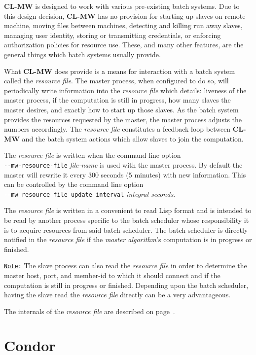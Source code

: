 \documentclass[titlepage,12pt]{book}
\newcommand{\xsmall}{\latexhtml{\small}{}}
\newcommand{\xnormalsize}{\latexhtml{\normalsize}{}}
\newcommand{\clmw}{\xsmall\textbf{CL-MW}\xnormalsize\xspace}
\newcommand{\ma}{\textit{master algorithm}\xspace}
\newcommand{\rfile}{\textit{resource file}\xspace}
\newcommand{\dash}{\texttt{-}}
\newcommand{\OptionV}[2]{\dash\dash\texttt{#1} \textit{#2}}
\newcommand{\Note}{\texttt{\underline{Note}:}\xspace}
\begin{document}
\clmw is designed to work with various pre-existing batch systems. Due
to this design decision, \clmw has no provision for starting up slaves
on remote machine, moving files between machines, detecting and killing
run away slaves, managing user identity, storing or transmitting
credentials, or enforcing authorization policies for resource use.
These, and many other features, are the general things which batch
systems usually provide.

What \clmw does provide is a means for interaction with a batch system
called the \rfile.  The master process, when configured to do so,
will periodically write information into the \rfile which details:
liveness of the master process, if the computation is still in progress,
how many slaves the master desires, and exactly how to start up those
slaves. As the batch system provides the resources requested by the
master, the master process adjusts the numbers accordingly. The
\rfile constitutes a feedback loop between \clmw and the batch
system actions which allow slaves to join the computation.

The \rfile is written when the command line option\\
\OptionV{mw-resource-file}{file-name} is used with the
master process. By default the master will rewrite it
every 300 seconds (5 minutes) with new information. This
can be controlled by the command line option\\
\OptionV{mw-resource-file-update-interval}{integral-seconds}.

The \rfile is written in a convenient to read Lisp format and is
intended to be read by another process specific to the batch scheduler
whose responsibility it is to acquire resources from said batch
scheduler. The batch scheduler is directly notified in the \rfile
if the {\ma}'s computation is in progress or finished.

\Note The slave process can also read the \rfile in order to determine
the master host, port, and member-id to which it should connect and
if the computation is still in progress or finished.  Depending upon
the batch scheduler, having the slave read the \rfile directly can
be a very advantageous.

The internals of the \rfile are described on
page~\pageref{resource-file}.

\section{Condor}
\end{document}
